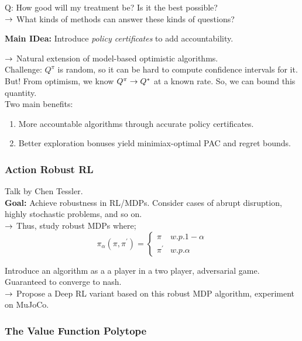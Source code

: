 Q: How good will my treatment be? Is it the best possible? \\
$\rightarrow$ What kinds of methods can answer these kinds of questions? 

{\bf Main IDea:} Introduce {\it policy certificates} to add accountability.

$\rightarrow$ Natural extension of model-based optimistic algorithms. \\

Challenge: $Q^\pi$ is random, so it can be hard to compute confidence intervals for it. But! From optimism, we know $Q^\pi \rightarrow Q^*$ at a known rate. So, we can bound this quantity. \\

Two main benefits:
\begin{enumerate}
    \item More accountable algorithms through accurate policy certificates.
    \item Better exploration bonuses yield minimiax-optimal PAC and regret bounds.
\end{enumerate}

\spacerule

\subsubsection{Action Robust RL}


Talk by Chen Tessler. \\

{\bf Goal:} Achieve robustness in RL/MDPs. Consider cases of abrupt disruption, highly stochastic problems, and so on. \\

$\rightarrow$ Thus, study robust MDPs where;
\[
\pi_\alpha(\pi, \pi^') = \begin{cases}
\pi& w.p. 1-\alpha \\
\pi^'& w.p. \alpha
\end{cases}
\]

Introduce an algorithm as a a player in a two player, adversarial game. Guaranteed to converge to nash. \\

$\rightarrow$ Propose a Deep RL variant based on this robust MDP algorithm, experiment on MuJoCo. 

\spacerule

\subsubsection{The Value Function Polytope}

